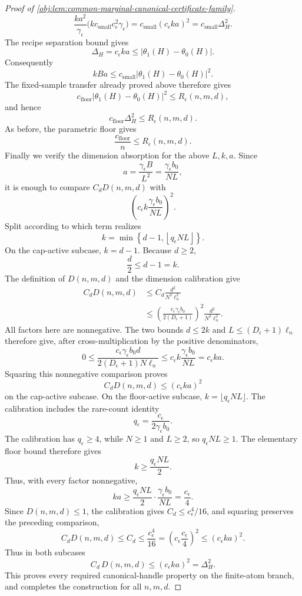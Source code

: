 \begin{proof}[Proof of \cref{obj:lem:common-marginal-canonical-certificate-family}]
\[\frac{k a^2}{\gamma_\epsilon}
\bigl(kc_{\mathrm{small}}c_\epsilon^2\gamma_\epsilon\bigr)
=
c_{\mathrm{small}}(c_\epsilon ka)^2
=
c_{\mathrm{small}}\Delta_H^2.
\]
The recipe separation bound gives
\[
\Delta_H=c_\epsilon ka
\le
\left|\theta_1(H)-\theta_0(H)\right|.
\]
Consequently
\[
kBa
\le
c_{\mathrm{small}}
\left|\theta_1(H)-\theta_0(H)\right|^2 .
\]
The fixed-sample transfer already proved above therefore gives
\[
c_{\mathrm{floor}}
\left|\theta_1(H)-\theta_0(H)\right|^2
\le
R_\epsilon(n,m,d),
\]
and hence
\[
c_{\mathrm{floor}}\Delta_H^2\le R_\epsilon(n,m,d).
\]
As before, the parametric floor gives
\[
\frac{c_{\mathrm{floor}}}{n}\le R_\epsilon(n,m,d).
\]
Finally we verify the dimension absorption for the above \(L,k,a\).  Since
\[
a=\frac{\gamma_\epsilon B}{L^2}
=\frac{\gamma_\epsilon b_0}{NL},
\]
it is enough to compare \(C_dD(n,m,d)\) with
\[
\left(c_\epsilon k\frac{\gamma_\epsilon b_0}{NL}\right)^2.
\]
Split according to which term realizes
\[
k=\min\left\{d-1,\left\lfloor q_\epsilon NL\right\rfloor\right\}.
\]
On the cap-active subcase, \(k=d-1\).  Because \(d\ge2\),
\[
\frac d2\le d-1=k.
\]
The definition of \(D(n,m,d)\) and the dimension calibration give
\[
\begin{aligned}
C_dD(n,m,d)
&\le C_d\frac{d^2}{N^2\ell_n^2} \\
&\le
\left(\frac{c_\epsilon\gamma_\epsilon b_0}{2(D_\epsilon+1)}\right)^2
\frac{d^2}{N^2\ell_n^2}.
\end{aligned}
\]
All factors here are nonnegative.  The two bounds
\(d\le2k\) and \(L\le(D_\epsilon+1)\ell_n\) therefore give, after
cross-multiplication by the positive denominators,
\[
0\le
\frac{c_\epsilon\gamma_\epsilon b_0d}
     {2(D_\epsilon+1)N\ell_n}
\le
c_\epsilon k\frac{\gamma_\epsilon b_0}{NL}
=c_\epsilon ka.
\]
Squaring this nonnegative comparison proves
\[
C_dD(n,m,d)\le(c_\epsilon ka)^2
\]
on the cap-active subcase.
On the floor-active subcase, \(k=\lfloor q_\epsilon NL\rfloor\).  The calibration includes the rare-count identity
\[
q_\epsilon=\frac{c_\epsilon}{2\gamma_\epsilon b_0}.
\]
The calibration has \(q_\epsilon\ge4\), while \(N\ge1\) and \(L\ge2\), so
\(q_\epsilon NL\ge1\).  The elementary floor bound therefore gives
\[
k\ge \frac{q_\epsilon NL}{2}.
\]
Thus, with every factor nonnegative,
\[
ka
\ge
\frac{q_\epsilon NL}{2}\cdot\frac{\gamma_\epsilon b_0}{NL}
=\frac{c_\epsilon}{4}.
\]
Since \(D(n,m,d)\le1\), the calibration gives
\(C_d\le c_\epsilon^4/16\), and squaring preserves the preceding comparison,
\[
C_dD(n,m,d)
\le C_d
\le \frac{c_\epsilon^4}{16}
=\left(c_\epsilon\frac{c_\epsilon}{4}\right)^2
\le (c_\epsilon ka)^2.
\]
Thus in both subcases
\[
C_d\,D(n,m,d)\le (c_\epsilon ka)^2=\Delta_H^2.
\] %
This proves every required canonical-handle property on the finite-atom branch, and completes the construction for all \(n,m,d\). %
\end{proof}
